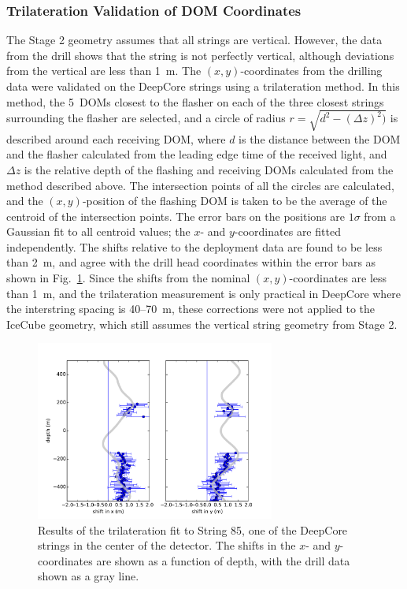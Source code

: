 \subsubsection{\label{sec:trilateration}Trilateration Validation of DOM Coordinates}

The Stage 2 geometry assumes that all strings are vertical. However, the
data from the drill shows that the string is not perfectly vertical,
although deviations from the vertical are less than 1~m. The
$(x,y)$-coordinates from the drilling data were validated on the DeepCore strings
using a trilateration method. In this method, the 5~DOMs closest to the
flasher on each of the three closest strings surrounding the flasher are
selected, and a circle of radius $r = \sqrt{d^2 - (\Delta z)^2)}$ is
described around each receiving DOM, where $d$ is the distance between the DOM
and the flasher calculated from the leading edge time of the received
light, and $\Delta z$ is the relative depth of the flashing and receiving
DOMs calculated from the method described above. The intersection points of
all the circles are calculated, and the $(x,y)$-position of the flashing DOM
is taken to be the average of the centroid of the intersection points. The
error bars on the positions are $1 \sigma$ from a Gaussian fit to all
centroid values; the $x$- and $y$-coordinates are fitted independently. The
shifts relative to the deployment data are found to be less than 2~m, and
agree with the drill head coordinates within the error bars as shown in
Fig.~\ref{fig:trilateration}. Since the shifts from the nominal
$(x,y)$-coordinates are less than 1~m, and the trilateration measurement is only
practical in DeepCore where the interstring spacing is 40--70~m, these
corrections were not applied to the IceCube geometry, which still assumes
the vertical string geometry from Stage 2.

\begin{figure}[!ht]
 \centering
 \includegraphics[width=0.7\textwidth]{graphics/geometry/newtrilat85.pdf}
\caption{Results of the trilateration fit to String 85, one of the DeepCore
  strings in the center of the detector. The shifts in the
  $x$- and $y$-coordinates are shown as a function of depth, with the drill data
  shown as a gray line.}
\label{fig:trilateration}
\end{figure}

